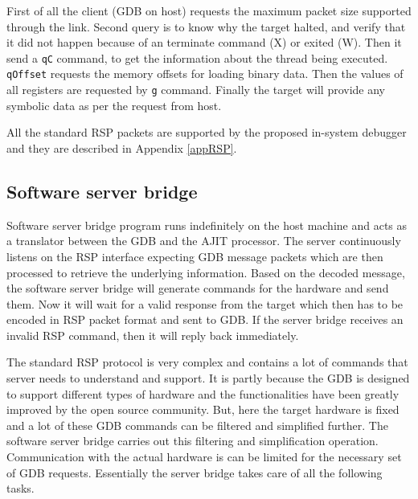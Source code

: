 First of all the client (GDB on host) requests the maximum packet size supported through the link. Second query is to know why the target halted, and verify that it did not happen because of an terminate command (X) or exited (W). Then it send a \texttt{qC} command, to get the information about the thread being executed. \texttt{qOffset} requests the memory offsets for loading binary data. Then the values of all registers are requested by \texttt{g} command. Finally the target will provide any symbolic data as per the request from host.

All the standard RSP packets are supported by the proposed in-system debugger and they are described in Appendix \ref{appRSP}.


\subsection{Software server bridge}
Software server bridge program runs indefinitely on the host machine and acts as a translator between the GDB and the AJIT processor. The server continuously listens on the RSP interface expecting GDB message packets which are then processed to retrieve the underlying information. Based on the decoded message, the software server bridge will generate commands for the hardware and send them. Now it will wait for a valid response from the target which then has to be encoded in RSP packet format and sent to GDB. If the server bridge receives an invalid RSP command, then it will reply back immediately.

The standard RSP protocol is very complex and contains a lot of commands that server needs to understand and support. It is partly because the GDB is designed to support different types of hardware and the functionalities have been greatly improved by the open source community. But, here the target hardware is fixed and a lot of these GDB commands can be filtered and simplified further. The software server bridge carries out this filtering and simplification operation. Communication with the actual hardware is can be limited for the necessary set of GDB requests. Essentially the server bridge takes care of all the following tasks.

